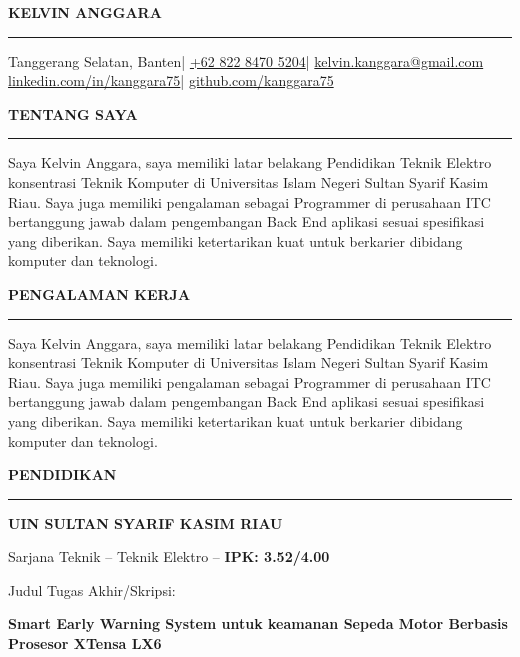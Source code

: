 \documentclass[11pt,a4paper]{article}
\newcommand{\email}[1]{\href{mailto:#1}{#1}} %
\newcommand{\link}[1]{\href{https://#1}{#1}} %
\newcommand{\pipe}{|}
\begin{document}
\begingroup
\hfill{\MakeUppercase{\huge\scshape\bfseries Kelvin Anggara}}\hfill
\break
\vspace{-0.5em}
\hrule
\vspace{-0.2em}
\hfill
{}
{Tanggerang Selatan, Banten}\pipe
{}
\href{https://wa.me/6282284705204}{+62 822 8470 5204}\pipe
{}
\email{kelvin.kanggara@gmail.com}
\hfill
\break
\vspace{-0.5em}
\hfill
{}
\link{linkedin.com/in/kanggara75}\pipe
{}
\link{github.com/kanggara75}
\hfill
\break
\endgroup

\begingroup
\raggedright\MakeUppercase{\large\textbf{TENTANG SAYA}}
\break\vspace{-1em}
\hrule
\normalsize{Saya Kelvin Anggara, saya memiliki latar belakang Pendidikan Teknik Elektro konsentrasi Teknik Komputer di Universitas Islam Negeri Sultan Syarif Kasim Riau. Saya juga memiliki pengalaman sebagai Programmer di perusahaan ITC bertanggung jawab dalam pengembangan Back End aplikasi sesuai spesifikasi yang diberikan. Saya memiliki ketertarikan kuat untuk berkarier dibidang komputer dan teknologi.}
\break\vspace{-0.5em}
\endgroup

\begingroup
\raggedright\MakeUppercase{\large\textbf{Pengalaman Kerja}}
\break\vspace{-1em}
\hrule
\normalsize{Saya Kelvin Anggara, saya memiliki latar belakang Pendidikan Teknik Elektro konsentrasi Teknik
  Komputer di Universitas Islam Negeri Sultan Syarif Kasim Riau. Saya juga memiliki pengalaman
  sebagai Programmer di perusahaan ITC bertanggung jawab dalam pengembangan Back End aplikasi
  sesuai spesifikasi yang diberikan. Saya memiliki ketertarikan kuat untuk berkarier dibidang komputer
  dan teknologi.}
\break\vspace{-0.5em}
\endgroup

\begingroup
\raggedright\MakeUppercase{\large\textbf{PENDIDIKAN}}
\break\vspace{-1em}
\hrule
\normalsize\raggedright\textbf{UIN SULTAN SYARIF KASIM RIAU}\hfill
{}\\
\normalsize\raggedright{Sarjana Teknik – Teknik Elektro –} \textbf{IPK: 3.52/4.00}\hfill
{}\\
\normalsize\raggedright{Judul Tugas Akhir/Skripsi:}\\
\small\raggedright\textbf{Smart Early Warning System untuk keamanan Sepeda Motor Berbasis Prosesor XTensa LX6}\\
\break\vspace{-0.5em}
\endgroup
\end{document}
